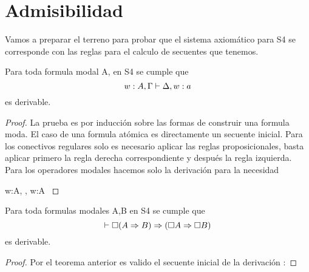 \section{Admisibilidad}

Vamos a preparar el terreno para probar que el sistema axiomático para S4 se corresponde con las reglas para el calculo de secuentes que tenemos.

\begin{teo}
  Para toda formula modal A, en S4 se cumple que  
  \begin{equation*}
    w:A, \Gamma \vdash \Delta,w:a 
  \end{equation*}
  es derivable.
\end{teo}

\begin{proof}
  La prueba es por inducción sobre las formas de construir una formula moda. El caso de una formula atómica es directamente un secuente inicial.
  Para los conectivos regulares solo es necesario aplicar las reglas proposicionales, basta aplicar primero la regla derecha correspondiente y después la regla izquierda.
  Para los operadores modales hacemos solo la derivación para la necesidad


  {
    w:\necesidad A, \Gamma \derives \Delta, w:\necesidad A
  }

\end{proof}


\begin{teo}
  Para toda formulas modales A,B en S4 se cumple que  
  \begin{equation*}
    \vdash \square(A \Rightarrow B) \Rightarrow (\square A \Rightarrow \square B) 
  \end{equation*}
  es derivable.
\end{teo}



\begin{proof}

  Por el teorema anterior es valido el secuente inicial de la derivación :

\end{proof}


